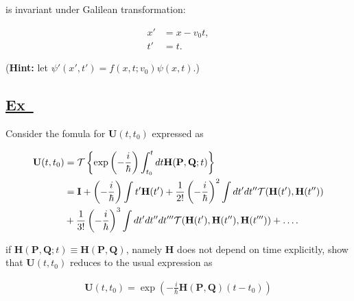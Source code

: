 \documentclass[a4paper,12pt]{article}
\newcommand{\excercise}{\addtocounter{section}{+1}
\subsection*{\underline{Ex~\thesection}}}
\begin{document}
\noindent is invariant under Galilean transformation:

\begin{align*}
x'&=x-v_0t,\\
t'&=t.
\end{align*}

(\textbf{Hint:} let $ \psi'(x', t')=f(x, t; v_0)\psi(x, t) $.)

\excercise
 
Consider the fomula for $\mathbf{U}(t, t_0)$ expressed as 


\begin{align}
\notag\mathbf{U}(t, t_0)&=\mathcal{T}\left\{\exp\left(-\frac{i}{\hbar}\right)\int^t_{t_0}dt\mathbf{H}(\mathbf{P,Q};t)\right\}\\
\notag &=\mathbf{I}+\left(-\frac{i}{\hbar}\right)\int t'\mathbf{H}(t')+\frac{1}{2!}\left(-\frac{i}{\hbar}\right)^2\int dt'dt''\mathcal{T}(\mathbf{H}(t'), \mathbf{H}(t''))\\&+\frac{1}{3!}\left(-\frac{i}{\hbar}\right)^3\int dt'dt''dt'''\mathcal{T}(\mathbf{H}(t'), \mathbf{H}(t''), \mathbf{H}(t'''))+\ldots .
\end{align}


if $\mathbf{H}(\mathbf{P, Q};t)\equiv \mathbf{H(P, Q)}$, namely $\mathbf{H}$ does not depend on time explicitly, show that $\mathbf{U}(t, t_0)$ reduces to the usual expression as

\begin{align}
\mathbf{U}(t, t_0)=\exp\left(-\frac{i}{\hbar}\mathbf{H(P, Q)}(t-t_0)\right)
\end{align}
\end{document}
